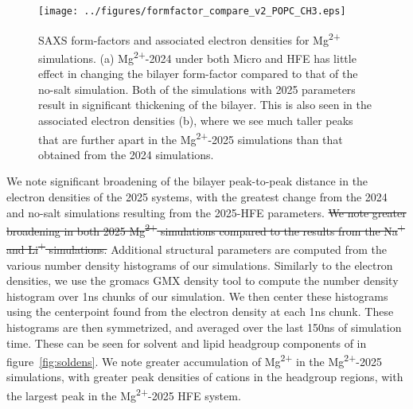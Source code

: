 \documentclass[12pt,openany,final]{book}
\newcommand{\na}{Na\textsuperscript{+}}
\newcommand{\li}{Li\textsuperscript{+}}
\newcommand{\mg}{Mg\textsuperscript{2+}}
\begin{document}
\begin{figure}[H]
    \caption[Bilayer SAXS Form-factors and electron densities]{SAXS form-factors and associated electron densities for \mg{} simulations. (a) \mg{-2024} under both Micro
and HFE has little effect in changing the bilayer form-factor compared to that of the no-salt simulation. Both of the simulations with 2025 parameters result in significant thickening of the bilayer.
This is also seen in the associated electron densities (b), where we see much taller peaks that are further apart in the \mg{-2025} simulations
than that obtained from the 2024 simulations.}
    \label{fig:formfactors}
    \texttt{[image: ../figures/formfactor\_compare\_v2\_POPC\_CH3.eps]}
\end{figure}
We note significant broadening of the bilayer peak-to-peak distance in the electron densities of the 2025 systems, with the greatest change from the 2024 and no-salt simulations resulting from the 2025-HFE parameters. \st{We note greater broadening in both 2025 \mg{} simulations compared to the results from the \na{} and \li{} simulations.}
Additional structural parameters are computed from the various number density histograms of our simulations. Similarly to the electron densities, we use the gromacs GMX density tool to compute the number density histogram over 1ns chunks of our simulation. We then center these histograms using the centerpoint found from the electron
density at each 1ns chunk.
These histograms are then symmetrized, and averaged over the last 150ns of simulation time.
These can be seen for solvent and lipid headgroup components of in figure~\ref{fig:soldens}.
We note greater accumulation of \mg{} in the \mg{-2025} simulations, with greater peak densities of cations in the headgroup regions, with the largest peak in the \mg{-2025} HFE system.
\end{document}
